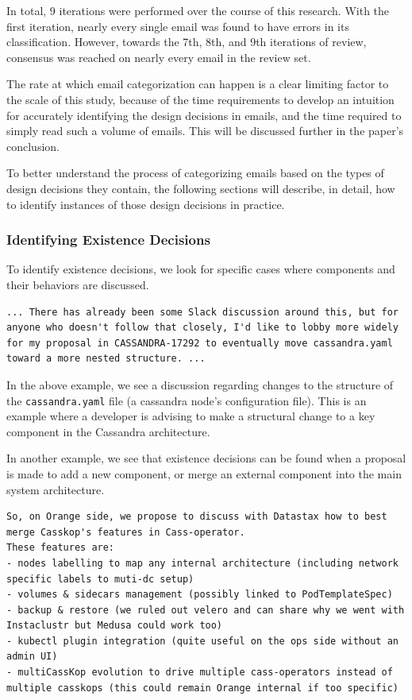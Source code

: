 \documentclass[a4paper, 12pt]{article}
\begin{document}
		In total, 9 iterations were performed over the course of this research. With the first iteration, nearly every single email was found to have errors in its classification. However, towards the 7th, 8th, and 9th iterations of review, consensus was reached on nearly every email in the review set.
	
		The rate at which email categorization can happen is a clear limiting factor to the scale of this study, because of the time requirements to develop an intuition for accurately identifying the design decisions in emails, and the time required to simply read such a volume of emails. This will be discussed further in the paper's conclusion.
		
		To better understand the process of categorizing emails based on the types of design decisions they contain, the following sections will describe, in detail, how to identify instances of those design decisions in practice.
		
		\subsubsection{Identifying \textbf{Existence} Decisions}
			To identify existence decisions, we look for specific cases where components and their behaviors are discussed.
			\begin{verbatim}
... There has already been some Slack discussion around this, but for anyone who doesn't follow that closely, I'd like to lobby more widely for my proposal in CASSANDRA-17292 to eventually move cassandra.yaml toward a more nested structure. ...
			\end{verbatim}
			In the above example, we see a discussion regarding changes to the structure of the \texttt{cassandra.yaml} file (a cassandra node's configuration file). This is an example where a developer is advising to make a structural change to a key component in the Cassandra architecture.
			
			In another example, we see that existence decisions can be found when a proposal is made to add a new component, or merge an external component into the main system architecture.
			\begin{verbatim}
So, on Orange side, we propose to discuss with Datastax how to best merge Casskop's features in Cass-operator.
These features are:
- nodes labelling to map any internal architecture (including network specific labels to muti-dc setup)
- volumes & sidecars management (possibly linked to PodTemplateSpec)
- backup & restore (we ruled out velero and can share why we went with Instaclustr but Medusa could work too)
- kubectl plugin integration (quite useful on the ops side without an admin UI)
- multiCassKop evolution to drive multiple cass-operators instead of multiple casskops (this could remain Orange internal if too specific)
			\end{verbatim}
			
\end{document}
